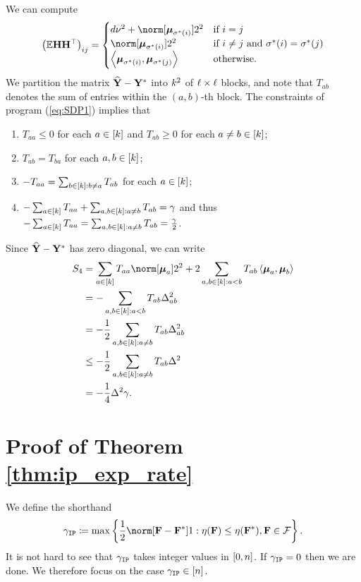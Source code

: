 We can compute 
\[
\left(\E\H\H\t\right)_{ij}=\begin{cases}
\vecdim\std^{2}+\norm[\Mean_{\labelstar(i)}]2^{2} & \text{if }i=j\\
\norm[\Mean_{\labelstar(i)}]2^{2} & \text{if }i\ne j\text{ and }\labelstar(i)=\labelstar(j)\\
\left\langle \Mean_{\labelstar(i)},\Mean_{\labelstar(j)}\right\rangle  & \text{otherwise}.
\end{cases}
\]
We partition the matrix $\widehat{\mathbf{Y}}-\mathbf{Y}^{*}$ into $k^{2}$ of $\ell\times\ell$
blocks, and note that $T_{ab}$ denotes the sum of entries within
the $(a,b)$-th block. The constraints of program (\ref{eq:SDP1})
implies that 
\begin{enumerate}
\item $T_{aa}\leq0$ for each $a\in\left[k\right]$ and $T_{ab}\geq0$
for each $a\ne b\in\left[k\right]$;
\item $T_{ab}=T_{ba}$ for each $a,b\in\left[k\right]$;
\item $-T_{aa}=\sum_{b\in\left[k\right]:b\ne a}T_{ab}$ for each
$a\in\left[k\right]$;
\item $-\sum_{a\in\left[k\right]}T_{aa}+\sum_{a,b\in\left[k\right]:a\ne b}T_{ab}=\gamma$
and thus $-\sum_{a\in\left[k\right]}T_{aa}=\sum_{a,b\in\left[k\right]:a\ne b}T_{ab}=\frac{\gamma}{2}$.
\end{enumerate}
Since $\widehat{\mathbf{Y}}-\mathbf{Y}^{*}$ has zero diagonal, we can write 
\begin{align*}
S_{4} & =\sum_{a\in\left[\numclust\right]}T_{aa}\norm[\Mean_{a}]2^{2}+2\sum_{a,b\in\left[\numclust\right]:a<b}T_{ab}\left\langle \Mean_{a},\Mean_{b}\right\rangle \\
 & =-\sum_{a,b\in\left[\numclust\right]:a<b}T_{ab}\minsep_{ab}^{2}\\
 & =-\frac{1}{2}\sum_{a,b\in\left[\numclust\right]:a\ne b}T_{ab}\minsep_{ab}^{2}\\
 & \leq-\frac{1}{2}\sum_{a,b\in\left[\numclust\right]:a\ne b}T_{ab}\minsep^{2}\\
 & =-\frac{1}{4}\minsep^{2}\error.
\end{align*}


\section{Proof of Theorem \ref{thm:ip_exp_rate}\label{sec:proof_ip_exp_rate}}

We define the shorthand 
\[
\iperror\coloneqq\max\left\{ \frac{1}{2}\norm[\F-\F^{*}]1:\eta(\F)\le\eta(\F^{*}),\F\in\mathcal{F}\right\} .
\]
It is not hard to see that $\gamma_{\textup{\texttt{IP}}}$ takes integer values in $[0,n]$.
If $\gamma_{\textup{\texttt{IP}}}=0$ then we are done. We therefore focus on the case
$\gamma_{\textup{\texttt{IP}}}\in\left[n\right]$.

